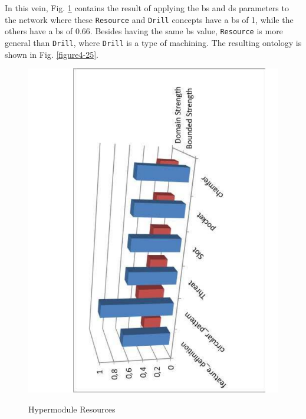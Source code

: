 In this vein, Fig. \ref{figure4-24} contains the result of applying the \gls{bs} and \gls{ds} parameters to the network where these \texttt{Resource} and \texttt{Drill} concepts have a \gls{bs} of 1, while the others have a \gls{bs} of 0.66. Besides having the same \gls{bs} value, \texttt{Resource} is more general than \texttt{Drill}, where \texttt{Drill} is a type of machining. The resulting ontology is shown in Fig. \ref{figure4-25}.


\begin{figure}
	\centering
	\scriptsize
	\begin{minipage}{.5\textwidth}
		\includegraphics[scale=0.35, angle=-90]{figure-chapterIV/fig4-24.pdf}\\
		\caption{Hypermodule Resources}
		\label{figure4-24}
	\end{minipage}%
	\begin{minipage}{.5\textwidth}

\end{minipage}
\end{figure}
